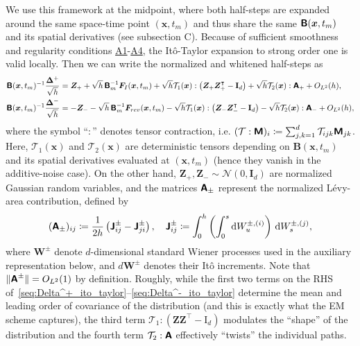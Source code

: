 We use this framework at the midpoint, where both half-steps are expanded around the same space-time point $(\bm{x},t_m)$ and thus share the same $\boldsymbol{\mathsf{B}}(\bm{x},t_m)$ and its spatial derivatives (see subsection C). Because of sufficient smoothness and regularity conditions \hyperlink{assumption:A1}{A1}-\hyperlink{assumption:A4}{A4}, the It\^{o}-Taylor expansion to strong order one is valid locally. Then we can write the normalized and whitened half-steps as
\begin{align}
    \boldsymbol{\mathsf{B}}(\bm{x},t_m)^{-1}\frac{\bm\Delta^+}{\sqrt{h}}
        &=\bm{Z}_++\sqrt{h}\,\boldsymbol{\mathsf{B}}_m^{-1}\bm{F}_I(\bm{x},t_m)
        +\sqrt{h}\mathcal{T}_1(\bm{x}):\left(\bm{Z}_+\bm{Z}_+^\intercal-\mathbf{I}_d\right)
        +\sqrt{h}\mathcal{T}_2(\bm{x}):\boldsymbol{\mathsf{A}}_+
        +O_{L^2}(h),
        \label{seq:Delta^+_ito_taylor}
        \\
        \boldsymbol{\mathsf{B}}(\bm{x},t_m)^{-1}\frac{\bm\Delta^-}{\sqrt{h}}
        &=-\bm{Z}_--\sqrt{h}\,\boldsymbol{\mathsf{B}}_m^{-1}\bm{F}_{rev}(\bm{x},t_m)
        -\sqrt{h}\mathcal{T}_1(\bm{x}):\left(\bm{Z}_-\bm{Z}_-^\intercal-\mathbf{I}_d\right)
        -\sqrt{h}\mathcal{T}_2(\bm{x}):\boldsymbol{\mathsf{A}}_-
        +O_{L^2}(h),
    \label{seq:Delta^-_ito_taylor}
\end{align}
where the symbol ``$:$'' denotes tensor contraction, i.e.
$(\mathcal{T}:\boldsymbol{\mathsf{M}})_i\coloneq\sum_{j,k=1}^d\mathcal{T}_{ijk}\boldsymbol{\mathsf{M}}_{jk}$.
Here, $\mathcal{T}_1(\bm{x})$ and $\mathcal{T}_2(\bm{x})$ are deterministic tensors depending on
$\mathbf{B}(\bm{x},t_m)$ and its spatial derivatives evaluated at $(\bm{x},t_m)$ (hence they vanish in the additive-noise case).
On the other hand, $\bm{Z}_+,\bm{Z}_-\sim\mathcal{N}(0,\mathbf{I}_d)$ are normalized Gaussian random variables,
and the matrices $\boldsymbol{\mathsf{A}}_{\pm}$ represent the normalized  L\'{e}vy-area contribution, defined by
\begin{equation}
    (\boldsymbol{\mathsf{A}}_{\pm})_{ij}\coloneq
    \frac{1}{2h}\left(\boldsymbol{\mathsf{J}}^{\pm}_{ij}-\boldsymbol{\mathsf{J}}^{\pm}_{ji}\right),
    \quad
    \boldsymbol{\mathsf{J}}^{\pm}_{ij}\coloneq
    \int_0^h \left(\int_0^s \mathrm{d}W^{\pm,(i)}_u\right)\, \mathrm{d}W^{\pm,(j)}_s,
    \label{seq:def_levy_area_matrix}
\end{equation}
where $\bm{W}^\pm$ denote $d$-dimensional standard Wiener processes used in the auxiliary representation below,
and $d\bm{W}^\pm$ denotes their It\^o increments. Note that $\|\boldsymbol{\mathsf{A}}^\pm\|=O_{L^2}(1)$ by definition.
Roughly, while the first two terms on the RHS of~\eqref{seq:Delta^+_ito_taylor}--\eqref{seq:Delta^-_ito_taylor} determine the mean and leading order of covariance of the distribution (and this is exactly what the EM scheme captures), the third term $\mathcal{T}_1:(\bm{Z}\bm{Z}^\intercal-\mathrm{I}_d)$ modulates the ``shape'' of the distribution and the fourth term $\mathcal{T}_2:\boldsymbol{\mathsf{A}}$ effectively ``twists'' the individual paths.

